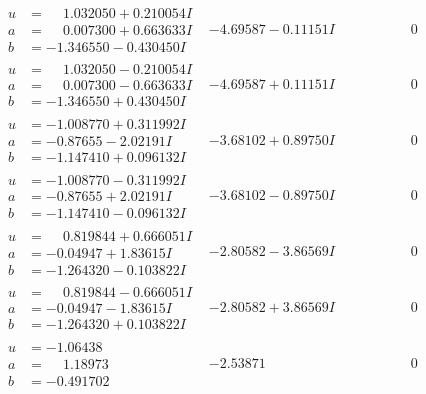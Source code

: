 \documentclass[1p]{elsarticle_modified}
\theoremstyle{definition}
\begin{document}
$$\begin{array}{c|c|c}
\begin{aligned}
u &= \phantom{-}1.032050 + 0.210054 I \\
a &= \phantom{-}0.007300 + 0.663633 I \\
b &= -1.346550 - 0.430450 I\end{aligned}
 & -4.69587 - 0.11151 I & \phantom{-0.000000 } 0 \\ \hline\begin{aligned}
u &= \phantom{-}1.032050 - 0.210054 I \\
a &= \phantom{-}0.007300 - 0.663633 I \\
b &= -1.346550 + 0.430450 I\end{aligned}
 & -4.69587 + 0.11151 I & \phantom{-0.000000 } 0 \\ \hline\begin{aligned}
u &= -1.008770 + 0.311992 I \\
a &= -0.87655 - 2.02191 I \\
b &= -1.147410 + 0.096132 I\end{aligned}
 & -3.68102 + 0.89750 I & \phantom{-0.000000 } 0 \\ \hline\begin{aligned}
u &= -1.008770 - 0.311992 I \\
a &= -0.87655 + 2.02191 I \\
b &= -1.147410 - 0.096132 I\end{aligned}
 & -3.68102 - 0.89750 I & \phantom{-0.000000 } 0 \\ \hline\begin{aligned}
u &= \phantom{-}0.819844 + 0.666051 I \\
a &= -0.04947 + 1.83615 I \\
b &= -1.264320 - 0.103822 I\end{aligned}
 & -2.80582 - 3.86569 I & \phantom{-0.000000 } 0 \\ \hline\begin{aligned}
u &= \phantom{-}0.819844 - 0.666051 I \\
a &= -0.04947 - 1.83615 I \\
b &= -1.264320 + 0.103822 I\end{aligned}
 & -2.80582 + 3.86569 I & \phantom{-0.000000 } 0 \\ \hline\begin{aligned}
u &= -1.06438\phantom{ +0.000000I} \\
a &= \phantom{-}1.18973\phantom{ +0.000000I} \\
b &= -0.491702\phantom{ +0.000000I}\end{aligned}
 & -2.53871\phantom{ +0.000000I} & \phantom{-0.000000 } 0 \\ \hline\begin{aligned}

\end{aligned}
\end{array}$$
\end{document}
